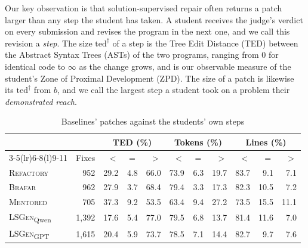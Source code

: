 \documentclass[conference]{IEEEtran}
\begin{document}
Our key observation is that solution-supervised repair often returns a patch larger than any step the student has taken. A student receives the judge's verdict on every submission and revises the program in the next one, and we call this revision a \emph{step}. The size \(\mathrm{ted}^{\dagger}\) of a step is the Tree Edit Distance (TED) between the Abstract Syntax Trees (ASTs) of the two programs, ranging from 0 for identical code to \(\infty\) as the change grows, and is our observable measure of the student's Zone of Proximal Development (ZPD). The size of a patch is likewise its \(\mathrm{ted}^{\dagger}\) from \(b\), and we call the largest step a student took on a problem their \emph{demonstrated reach}.

\begin{table}[h]
\caption{Baselines' patches against the students' own steps}
\label{tab:reach}
\centering\scriptsize
\setlength{\tabcolsep}{2.5pt}
\begin{tabular}{@{}l||r|rrr|rrr|rrr@{}}
\toprule
 & & \multicolumn{3}{c|}{TED (\%)} & \multicolumn{3}{c|}{Tokens (\%)} & \multicolumn{3}{c}{Lines (\%)} \\
\cmidrule(lr){3-5}\cmidrule(lr){6-8}\cmidrule(l){9-11}
 & Fixes & $<$ & $=$ & $>$ & $<$ & $=$ & $>$ & $<$ & $=$ & $>$ \\
\midrule
\textsc{Refactory} & 952 & 29.2 & 4.8 & 66.0 & 73.9 & 6.3 & 19.7 & 83.7 & 9.1 & 7.1 \\
\textsc{Brafar} & 962 & 27.9 & 3.7 & 68.4 & 79.4 & 3.3 & 17.3 & 82.3 & 10.5 & 7.2 \\
\textsc{Mentored} & 705 & 37.3 & 9.2 & 53.5 & 63.4 & 9.4 & 27.2 & 73.5 & 15.5 & 11.1 \\
\textsc{LSGen}\textsubscript{Qwen} & 1,392 & 17.6 & 5.4 & 77.0 & 79.5 & 6.8 & 13.7 & 81.4 & 11.6 & 7.0 \\
\textsc{LSGen}\textsubscript{GPT} & 1,615 & 20.4 & 5.9 & 73.7 & 78.5 & 7.1 & 14.4 & 82.7 & 9.7 & 7.6 \\
\bottomrule
\end{tabular}
\end{table}
\end{document}
